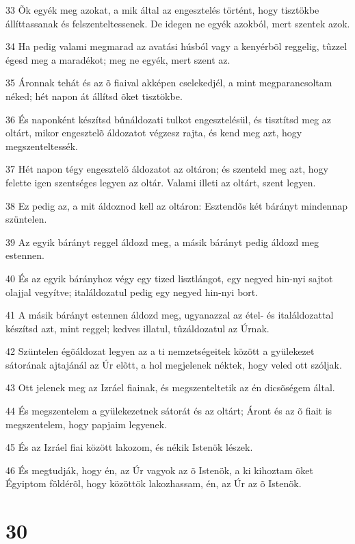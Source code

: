 \par 33 Õk egyék meg azokat, a mik által az engesztelés történt, hogy tisztökbe állíttassanak és felszenteltessenek. De idegen ne egyék azokból, mert szentek azok.
\par 34 Ha pedig valami megmarad az avatási húsból vagy a kenyérbõl reggelig, tûzzel égesd meg a maradékot; meg ne egyék, mert szent az.
\par 35 Áronnak tehát és az õ fiaival akképen cselekedjél, a mint megparancsoltam néked; hét napon át állítsd õket tisztökbe.
\par 36 És naponként készítsd bûnáldozati tulkot engesztelésül, és tisztítsd meg az oltárt, mikor engesztelõ áldozatot végzesz rajta, és kend meg azt, hogy megszenteltessék.
\par 37 Hét napon tégy engesztelõ áldozatot az oltáron; és szenteld meg azt, hogy felette igen szentséges legyen az oltár. Valami illeti az oltárt, szent legyen.
\par 38 Ez pedig az, a mit áldoznod kell az oltáron: Esztendõs két bárányt mindennap szüntelen.
\par 39 Az egyik bárányt reggel áldozd meg, a másik bárányt pedig áldozd meg estennen.
\par 40 És az egyik bárányhoz végy egy tized lisztlángot, egy negyed hin-nyi sajtot olajjal vegyítve; italáldozatul pedig egy negyed hin-nyi bort.
\par 41 A másik bárányt estennen áldozd meg, ugyanazzal az étel- és italáldozattal készítsd azt, mint reggel; kedves illatul, tûzáldozatul az Úrnak.
\par 42 Szüntelen égõáldozat legyen az a ti nemzetségeitek között a gyülekezet sátorának ajtajánál az Úr elõtt, a hol megjelenek néktek, hogy veled ott szóljak.
\par 43 Ott jelenek meg az Izráel fiainak, és megszenteltetik az én dicsõségem által.
\par 44 És megszentelem a gyülekezetnek sátorát és az oltárt; Áront és az õ fiait is megszentelem, hogy papjaim legyenek.
\par 45 És az Izráel fiai között lakozom, és nékik Istenök lészek.
\par 46 És megtudják, hogy én, az Úr vagyok az õ Istenök, a ki kihoztam õket Égyiptom földérõl, hogy közöttök lakozhassam, én, az Úr az õ Istenök.

\chapter{30}


